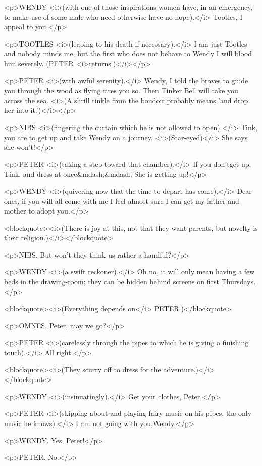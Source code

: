 <p>WENDY <i>(with one of those inspirations women have, in an emergency, to make use of some male who need otherwise have no hope).</i> Tootles, I appeal to you.</p>

<p>TOOTLES <i>(leaping to his death if necessary).</i> I am just Tootles and nobody minds me, but the first who does not behave to Wendy I will blood him severely. (PETER <i>returns.)</i></p>

<p>PETER <i>(with awful serenity).</i> Wendy, I told the braves to guide you through the wood as flying tires you so. Then Tinker Bell will take you across the sea. <i>(A shrill tinkle from the boudoir probably means 'and drop her into it.')</i></p>

<p>NIBS <i>(fingering the curtain which he is not allowed to open).</i> Tink, you are to get up and take Wendy on a journey. <i>(Star-eyed)</i> She says she won't!</p>

<p>PETER <i>(taking a step toward that chamber).</i> If you don'tget up, Tink, and dress at once&mdash;&mdash; She is getting up!</p>

<p>WENDY <i>(quivering now that the time to depart has come).</i> Dear ones, if you will all come with me I feel almost sure I can get my father and mother to adopt you.</p>

<blockquote><i>(There is joy at this, not that they want parents, but novelty is their religion.)</i></blockquote>

<p>NIBS. But won't they think us rather a handful?</p>

<p>WENDY <i>(a swift reckoner).</i> Oh no, it will only mean having a few beds in the drawing-room; they can be hidden behind screens on first Thursdays.</p>

<blockquote><i>(Everything depends on</i> PETER.)</blockquote>

<p>OMNES. Peter, may we go?</p>

<p>PETER <i>(carelessly through the pipes to which he is giving a finishing touch).</i> All right.</p>

<blockquote><i>(They scurry off to dress for the adventure.)</i></blockquote>

<p>WENDY <i>(insinuatingly).</i> Get your clothes, Peter.</p>

<p>PETER <i>(skipping about and playing fairy music on his pipes, the only music he knows).</i> I am not going with you,Wendy.</p>

<p>WENDY. Yes, Peter!</p>

<p>PETER. No.</p>

